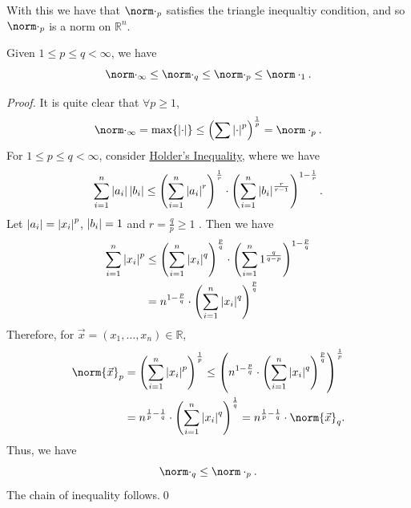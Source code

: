 \documentclass[notoc,notitlepage]{tufte-book}
\begin{document}
\begin{note}
  With this we have that $\norm\cdot_p$ satisfies the triangle inequaltiy condition, and so $\norm\cdot_p$ is a norm on $\mathbb{R}^n$.
\end{note}

\begin{note}
  Given $1 \leq p \leq q < \infty$, we have
  \begin{equation*}
    \norm\cdot_\infty \leq \norm\cdot_q \leq \norm\cdot_p \leq \norm\cdot_1.
  \end{equation*}

  \begin{proof}
    It is quite clear that $\forall p \geq 1$,
    \begin{equation*}
      \norm\cdot_\infty = \max \{ \abs{\cdot} \} \leq \left( \sum \abs{\cdot}^p \right)^{\frac{1}{p}} =\norm\cdot_p.
    \end{equation*}
    For $1 \leq p \leq q < \infty$, consider \hyperref[thm:holder_s_inequality]{Holder's Inequality}, where we have
    \begin{equation*}
      \sum_{i=1}^{n} \left|a_i\right| \left|b_i\right| \leq \left( \sum_{i=1}^{n} \left|a_i\right|^r \right)^{\frac{1}{r}} \cdot \left( \sum_{i=1}^{n} \left|b_i\right|^{\frac{r}{r - 1}} \right)^{1 - \frac{1}{r}}.
    \end{equation*}
    Let $\left|a_i\right| = \left|x_i\right|^p$, $\left|b_i\right| = 1$ and $r = \frac{q}{p} \geq 1$ . Then we have
    \begin{align*}
      \sum_{i=1}^{n} \left|x_i\right|^p &\leq \left( \sum_{i=1}^{n} \left|x_i\right|^q \right)^{\frac{p}{q}} \cdot \left( \sum_{i=1}^{n} 1^{\frac{q}{q - p}} \right)^{1 - \frac{p}{q}} \\
                                 &= n^{1 - \frac{p}{q}} \cdot \left( \sum_{i=1}^{n} \left|x_i\right|^q \right)^\frac{p}{q}
    \end{align*}
    Therefore, for $\vec{x} = (x_1, \ldots, x_n) \in \mathbb{R}$,
    \begin{align*}
      \norm{\vec{x}}_p &= \left( \sum_{i=1}^{n} \abs{x_i}^p \right)^{\frac{1}{p}} \leq \left( n^{1 - \frac{p}{q}} \cdot \left( \sum_{i=1}^{n} \abs{x_i}^q \right)^\frac{p}{q} \right)^{\frac{1}{p}} \\
                       &= n^{\frac{1}{p} - \frac{1}{q}} \cdot \left( \sum_{i=1}^{n} \abs{x_i}^q \right)^{\frac{1}{q}} = n^{\frac{1}{p} - \frac{1}{q}} \cdot \norm{\vec{x}}_q.
    \end{align*}
    Thus, we have
    \begin{equation*}
      \norm\cdot_q \leq \norm\cdot_p.
    \end{equation*}
    The chain of inequality follows.\qed
  \end{proof}
\end{note}
\end{document}
